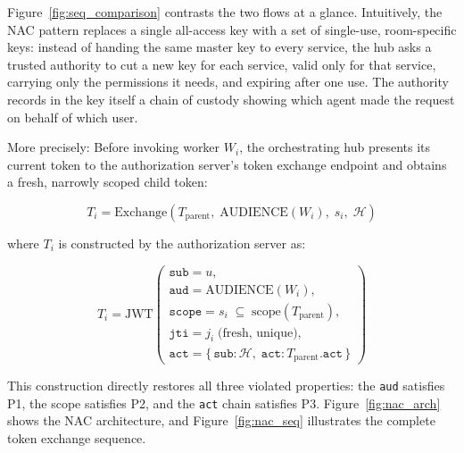 \documentclass[journal]{IEEEtran}
\begin{document}
Figure~\ref{fig:seq_comparison} contrasts the two flows at a glance.
Intuitively, the NAC pattern replaces a single all-access key with a set of
single-use, room-specific keys: instead of handing the same master key to every
service, the hub asks a trusted authority to cut a new key for each service,
valid only for that service, carrying only the permissions it needs, and expiring
after one use. The authority records in the key itself a chain of custody showing
which agent made the request on behalf of which user.

More precisely: Before invoking worker $W_i$, the orchestrating hub presents its
current token to the authorization server's token exchange endpoint and obtains a
fresh, narrowly scoped child token:

\begin{equation}
T_i = \mathrm{Exchange}\!\left(
  T_{\mathrm{parent}},\;
  \mathrm{AUDIENCE}(W_i),\;
  s_i,\;
  \mathcal{H}
\right)
\label{eq:exchange}
\end{equation}

where $T_i$ is constructed by the authorization server as:

\begin{equation}
T_i = \mathrm{JWT}\!\left(\begin{array}{l}
  \texttt{sub} = u, \\[2pt]
  \texttt{aud} = \mathrm{AUDIENCE}(W_i), \\[2pt]
  \texttt{scope} = s_i \;\subseteq\; \mathrm{scope}(T_{\mathrm{parent}}), \\[2pt]
  \texttt{jti} = j_i \;\text{(fresh, unique)}, \\[2pt]
  \texttt{act} = \{\,\texttt{sub}\text{:}\,\mathcal{H},\;
                    \texttt{act}\text{:}\,T_{\mathrm{parent}}.\texttt{act}\,\}
\end{array}\right)
\label{eq:child}
\end{equation}

This construction directly restores all three violated properties: the
\texttt{aud} satisfies P1, the scope satisfies P2, and the \texttt{act} chain
satisfies P3. Figure~\ref{fig:nac_arch} shows the NAC architecture, and
Figure~\ref{fig:nac_seq} illustrates the complete token exchange sequence.
\end{document}
